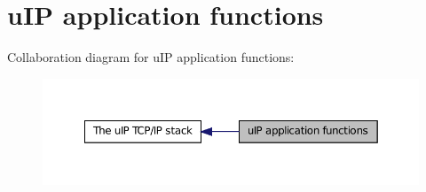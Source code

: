 \hypertarget{group__uipappfunc}{
\section{uIP application functions}
\label{group__uipappfunc}
}


Collaboration diagram for uIP application functions:
\nopagebreak
\begin{figure}[H]
\begin{center}
\leavevmode
\includegraphics[width=360pt]{group__uipappfunc}
\end{center}
\end{figure}


